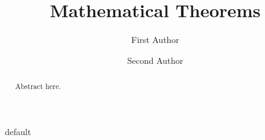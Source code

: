 \documentclass{amsart}
\theoremstyle{remark}
\numberwithin{equation}{section}
\begin{document}

\title{Mathematical Theorems}


\author{First Author}
\address{University of \ldots}


\author{Second Author}
\address{Address}



\begin{abstract}
Abstract here. 
\end{abstract}


\maketitle


\tableofcontents

{{~default~}}




\end{document}
